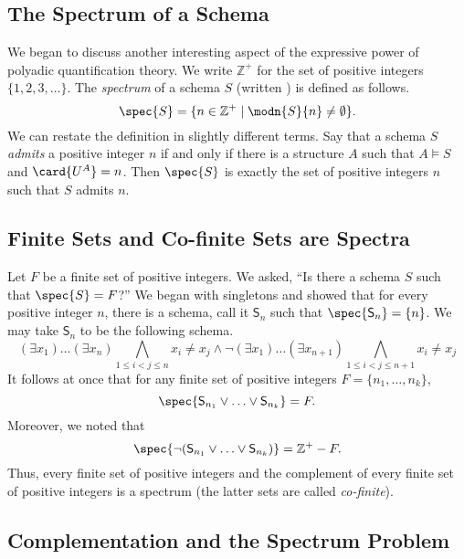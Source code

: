 \subsection{The Spectrum of a Schema}

We began to discuss another interesting aspect of the expressive power of polyadic quantification theory. We write $\mathbb{Z}^+$ for the set of positive integers $\{1,2,3,\ldots\}$. The \emph{spectrum} of a schema $S$ (written ) is defined as follows.
\[
\spec{S}=\{n\in \mathbb{Z}^+\mid \modn{S}{n}\neq\emptyset\}.
\]
We can restate the definition in slightly different terms. Say that a schema $S$ \emph{admits} a positive integer $n$ if and only if there is a structure $A$ such that $A\models S$ and $\card{U^A}=n$. Then $\spec{S}$ is exactly the set of positive integers $n$ such that $S$ admits $n$. 
\subsection{Finite Sets and Co-finite Sets are Spectra}

Let $F$ be a finite set of positive integers. We asked, ``Is there a schema $S$ such that $\spec{S}=F$?'' We began with singletons and showed that for every positive integer $n$, there is a schema, call it $\mathsf{S}_n$  such that $\spec{\mathsf{S}_n}=\{n\}$. 
We may take $\mathsf{S}_n$ to be the following schema.
\[
(\exists x_1)\ldots(\exists x_n)\bigwedge_{1\leq i<j\leq n}x_i\neq x_j\wedge \neg(\exists x_1)\ldots(\exists x_{n+1})\bigwedge_{1\leq i<j\leq n+1}x_i\neq x_j
\]
It follows at once that for any finite set of positive integers  $F=\{n_1,\ldots,n_k\}$,
\[
\spec{\mathsf{S}_{n_1}\vee\ldots\vee\mathsf{S}_{n_k}}= F.
\]
Moreover, we noted that
\[
\spec{\neg(\mathsf{S}_{n_1}\vee\ldots\vee\mathsf{S}_{n_k})}= \mathbb{Z}^+ - F.
\]
Thus, every finite set of positive integers and the complement of every finite set of positive integers is a spectrum (the latter sets are called \emph{co-finite}).
\subsection{Complementation and the Spectrum Problem}

